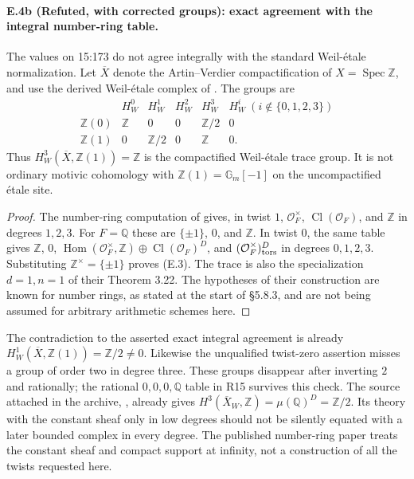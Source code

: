 \paragraph{E.4b (Refuted, with corrected groups): exact agreement with the integral number-ring table.}
The values on 15:173 do not agree integrally with the standard Weil-\'etale
normalization. Let $\overline X$ denote the Artin--Verdier compactification
of $X=\operatorname{Spec}\mathbb Z$, and use the derived Weil-\'etale
complex of \citet[Definition 3.6]{D_FlachMorin2018}. The groups are
\[
\begin{array}{c|cccc|c}
 &H_W^0&H_W^1&H_W^2&H_W^3&H_W^i\ (i\notin\{0,1,2,3\})\\ \hline
 \mathbb Z(0)&\mathbb Z&0&0&\mathbb Z/2&0\\
 \mathbb Z(1)&0&\mathbb Z/2&0&\mathbb Z&0.
\end{array}
 \tag{E.3}
\]
Thus $H_W^3(\overline X,\mathbb Z(1))=\mathbb Z$ is the compactified
Weil-\'etale trace group. It is not ordinary motivic cohomology with
$\mathbb Z(1)=\mathbb G_m[-1]$ on the uncompactified \'etale site.

\begin{proof}
The number-ring computation of
\citet[\S5.8.3, pp.~1503--1504]{D_FlachMorin2018} gives, in twist $1$,
$\mathcal O_F^\times$, $\operatorname{Cl}(\mathcal O_F)$, and $\mathbb Z$
in degrees $1,2,3$. For $F=\mathbb Q$ these are
$\{\pm1\}$, $0$, and $\mathbb Z$. In twist $0$, the same table gives
$\mathbb Z$, $0$,
$\operatorname{Hom}(\mathcal O_F^\times,\mathbb Z)
\oplus\operatorname{Cl}(\mathcal O_F)^D$, and
$(\mathcal O_F^\times)_{\rm tors}^D$ in degrees $0,1,2,3$.
Substituting $\mathbb Z^\times=\{\pm1\}$ proves (E.3).
The trace is also the specialization $d=1,n=1$ of their Theorem 3.22.
The hypotheses of their construction are known for number rings, as
stated at the start of \S5.8.3, and are not being assumed for arbitrary
arithmetic schemes here.
\end{proof}

The contradiction to the asserted exact integral agreement is already
$H_W^1(\overline X,\mathbb Z(1))=\mathbb Z/2\ne0$. Likewise the
unqualified twist-zero assertion misses a group of order two in degree
three. These groups disappear after inverting $2$ and rationally; the
rational $0,0,0,\mathbb Q$ table in R15 survives this check.
The source attached in the archive, \citet[Theorem 5.10]{D_Lichtenbaum2005},
already gives $H^3(\overline X_W,\mathbb Z)=\mu(\mathbb Q)^D=\mathbb Z/2$.
Its theory with the constant sheaf only in low degrees should not be
silently equated with a later bounded complex in every degree. The
published number-ring paper \citep{D_Lichtenbaum2009} treats the
constant sheaf and compact support at infinity, not a construction of
all the twists requested here.

